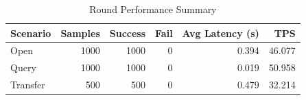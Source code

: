 \begin{table}
\caption{Round Performance Summary}
\label{tab:round_perf}
\begin{tabular}{lrrrrr}
\toprule
Scenario & Samples & Success & Fail & Avg Latency (s) & TPS \\
\midrule
Open & 1000 & 1000 & 0 & 0.394 & 46.077 \\
Query & 1000 & 1000 & 0 & 0.019 & 50.958 \\
Transfer & 500 & 500 & 0 & 0.479 & 32.214 \\
\bottomrule
\end{tabular}
\end{table}
